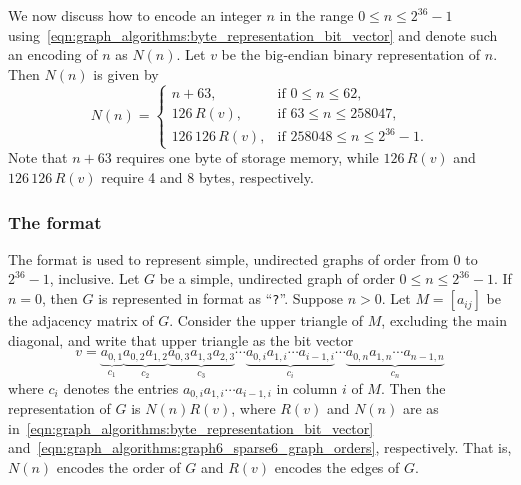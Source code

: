 We now discuss how to encode an integer $n$ in the range
$0 \leq n \leq 2^{36} - 1$
using~\eqref{eqn:graph_algorithms:byte_representation_bit_vector} and
denote such an encoding of $n$ as $N(n)$. Let $v$ be the
big-endian binary representation of $n$. Then $N(n)$
is given by
\begin{equation}
\label{eqn:graph_algorithms:graph6_sparse6_graph_orders}
N(n)
=
\begin{cases}
n + 63, & \text{if $0 \leq n \leq 62$}, \\
126 \, R(v), & \text{if $63 \leq n \leq 258047$}, \\
126 \, 126 \, R(v), & \text{if $258048 \leq n \leq 2^{36}-1$}.
\end{cases}
\end{equation}
Note that $n + 63$ requires one byte of storage memory, while
$126 \, R(v)$ and $126 \, 126 \, R(v)$ require 4 and 8 bytes,
respectively.



\subsubsection{The \graphsix format}
\index{\graphsix}

The \graphsix\index{\graphsix} format is used to represent simple,
undirected graphs of order from $0$ to $2^{36} - 1$, inclusive. Let
$G$ be a simple, undirected graph of order $0 \leq n \leq 2^{36} - 1$.
If $n = 0$, then $G$ is represented in \graphsix format as
``\verb!?!''. Suppose $n > 0$. Let $M = [a_{ij}]$ be the adjacency
matrix of $G$. Consider the upper
triangle of $M$, excluding the main
diagonal, and write that upper triangle as
the bit vector
\[
v
=
\underbrace{a_{0,1}}_{c_1}
\underbrace{a_{0,2} a_{1,2}}_{c_2}
\underbrace{a_{0,3} a_{1,3} a_{2,3}}_{c_3} \cdots
\underbrace{a_{0,i} a_{1,i} \cdots a_{i-1,i}}_{c_i} \cdots
\underbrace{a_{0,n} a_{1,n} \cdots a_{n-1,n}}_{c_n}
\]
where $c_i$ denotes the entries $a_{0,i} a_{1,i} \cdots a_{i-1,i}$ in
column $i$ of $M$. Then the \graphsix\index{\graphsix} representation
of $G$ is $N(n) R(v)$, where $R(v)$ and $N(n)$ are as
in~\eqref{eqn:graph_algorithms:byte_representation_bit_vector}
and~\eqref{eqn:graph_algorithms:graph6_sparse6_graph_orders},
respectively. That is, $N(n)$ encodes the order of $G$ and $R(v)$
encodes the edges of $G$.


